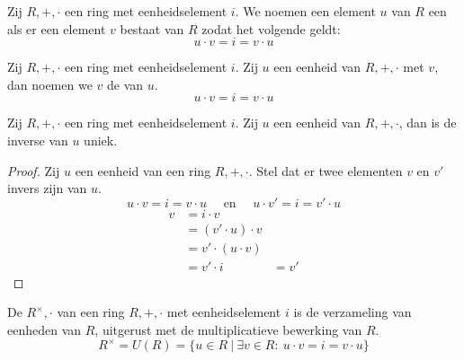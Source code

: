 \documentclass[main.tex]{subfiles}
\begin{document}
\begin{de}
  Zij $R,+,\cdot$ een ring met eenheidselement $i$.
  We noemen een element $u$ van $R$ een  als er een element $v$ bestaat van $R$ zodat het volgende geldt:
  \[ u \cdot v = i = v \cdot u \]
\end{de}

\begin{de}
  Zij $R,+,\cdot$ een ring met eenheidselement $i$.
  Zij $u$ een eenheid van $R,+,\cdot$ met $v$, dan noemen we $v$ de  van $u$.
  \[ u \cdot v = i = v \cdot u \]
\end{de}

\begin{st}
  Zij $R,+,\cdot$ een ring met eenheidselement $i$.
  Zij $u$ een eenheid van $R,+,\cdot$, dan is de inverse van $u$ uniek.

  \begin{proof}
    Zij $u$ een eenheid van een ring $R,+,\cdot$.
    Stel dat er twee elementen $v$ en $v'$ invers zijn van $u$.
    \[ u \cdot v = i = v \cdot u \quad\text{ en }\quad u \cdot v' = i = v' \cdot u \]
    \[
    \begin{array}{rll}
      v &= i \cdot v &\\
        &= (v' \cdot u) \cdot v &\\
        &= v' \cdot (u \cdot v) &\\
        &= v' \cdot i &= v'
    \end{array}
    \]
  \end{proof}
\end{st}

\begin{de}
  De  $R^{\times},\cdot$ van een ring $R,+,\cdot$ met eenheidselement $i$ is de verzameling van eenheden van $R$, uitgerust met de multiplicatieve bewerking van $R$.
  \[ R^{\times} = U(R) = \{ u \in R \ |\ \exists v \in R:\ u \cdot v = i = v \cdot u \} \]
\end{de}
\end{document}
